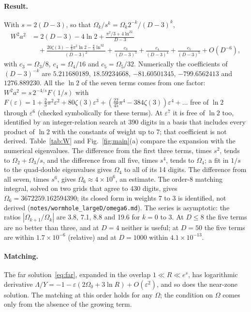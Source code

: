 \documentclass[11pt]{article}
\theoremstyle{remark}
\newcommand{\eps}{\varepsilon}
\begin{document}
\paragraph{Result.} With $s=2(D-3)$, so that $\Omega_k/s^k=\Omega_k2^{-k}/(D-3)^k$,
\begin{equation}
\boxed{\begin{aligned}W^2a^2&=2(D-3)-4\ln2+\frac{\pi^2/3+4\ln^22}{D-3}\\
&\quad+\frac{20\zeta(3)-\frac23\pi^2\ln2-\frac83\ln^32}{(D-3)^2}+\frac{c_3}{(D-3)^3}+\frac{c_4}{(D-3)^4}+\frac{c_5}{(D-3)^5}+O(D^{-6}),\end{aligned}}\label{eq:result}
\end{equation}
with $c_3=\Omega_3/8$, $c_4=\Omega_4/16$ and $c_5=\Omega_5/32$. Numerically the coefficients of $(D-3)^{-k}$ are
$5.211680189$, $18.59234668$, $-81.60501345$, $-799.6562413$ and $1276.889230$. All the $\ln2$ of the seven terms comes from
one factor: $W^2a^2=s\,2^{-4/s}F(1/s)$ with $F(\varepsilon)=1+\tfrac23\pi^2\varepsilon^2+80\zeta(3)\varepsilon^3+(\tfrac{22}{45}\pi^4-384\zeta(3))\varepsilon^4+\dots$ free of
$\ln2$ through $\varepsilon^6$ (checked symbolically for these terms). At $\varepsilon^7$ it is free of $\ln2$ too, identified by an
integer-relation search at 390 digits in a basis that includes every product of $\ln2$ with the constants of weight up to 7;
that coefficient is not derived. Table~\ref{tab:W} and
Fig.~\ref{fig:main}(a) compare the expansion with the numerical eigenvalues. The difference from the first three terms,
times $s^2$, tends to $\Omega_2+\Omega_3/s$, and the difference from all five, times $s^4$, tends to
$\Omega_4$; a fit in $1/s$ to the quad-double eigenvalues gives $\Omega_4$ to all of its 14 digits. The difference from all
seven, times $s^6$, gives $\Omega_6\approx4\times10^6$, an estimate. The order-8 matching integral, solved on two grids
that agree to 430 digits, gives $\Omega_6=3672259.162594390$; its closed form in weights 7 to 3 is identified, not derived
(\texttt{notes/wormhole\_largeD/omega6.md}). The series is asymptotic: the ratios
$|\Omega_{k+1}/\Omega_k|$ are 3.8, 7.1, 8.8 and 19.6 for $k=0$ to $3$. At $D\le8$ the five terms are no better than three,
and at $D=4$ neither is useful; at $D=50$ the five terms are within $1.7\times10^{-6}$ (relative) and at $D=1000$ within
$4.1\times10^{-13}$.

\paragraph{Matching.} The far solution~\eqref{eq:far}, expanded in the overlap $1\ll R\ll e^s$, has logarithmic derivative
$\Lambda/Y=-1-\eps(2\Omega_0+3\ln R)+O(\eps^2)$, and so does the near-zone solution. The matching at this order holds for
any $\Omega$; the condition on $\Omega$ comes only from the absence of the growing term.
\end{document}
